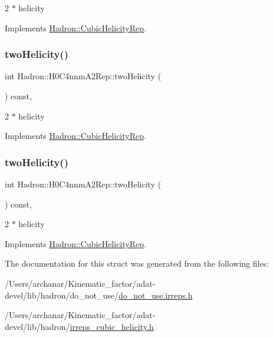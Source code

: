 2 $\ast$ helicity 

Implements \mbox{\hyperlink{structHadron_1_1CubicHelicityRep_af507aa56fc2747eacc8cb6c96db31ecc}{Hadron\+::\+Cubic\+Helicity\+Rep}}.

\mbox{\label{structHadron_1_1H0C4nnmA2Rep_a397249fde56ef379e5651fa31203da8c}} 
\subsubsection{\texorpdfstring{twoHelicity()}{twoHelicity()}\hspace{0.1cm}{\footnotesize\ttfamily [2/3]}}
{\footnotesize\ttfamily int Hadron\+::\+H0\+C4nnm\+A2\+Rep\+::two\+Helicity (\begin{DoxyParamCaption}{ }\end{DoxyParamCaption}) const\hspace{0.3cm}{\ttfamily [inline]}, {\ttfamily [virtual]}}

2 $\ast$ helicity 

Implements \mbox{\hyperlink{structHadron_1_1CubicHelicityRep_af507aa56fc2747eacc8cb6c96db31ecc}{Hadron\+::\+Cubic\+Helicity\+Rep}}.

\mbox{\label{structHadron_1_1H0C4nnmA2Rep_a397249fde56ef379e5651fa31203da8c}} 
\subsubsection{\texorpdfstring{twoHelicity()}{twoHelicity()}\hspace{0.1cm}{\footnotesize\ttfamily [3/3]}}
{\footnotesize\ttfamily int Hadron\+::\+H0\+C4nnm\+A2\+Rep\+::two\+Helicity (\begin{DoxyParamCaption}{ }\end{DoxyParamCaption}) const\hspace{0.3cm}{\ttfamily [inline]}, {\ttfamily [virtual]}}

2 $\ast$ helicity 

Implements \mbox{\hyperlink{structHadron_1_1CubicHelicityRep_af507aa56fc2747eacc8cb6c96db31ecc}{Hadron\+::\+Cubic\+Helicity\+Rep}}.



The documentation for this struct was generated from the following files\+:\begin{DoxyCompactItemize}
\item 
/\+Users/archanar/\+Kinematic\+\_\+factor/adat-\/devel/lib/hadron/do\+\_\+not\+\_\+use/\mbox{\hyperlink{adat-devel_2lib_2hadron_2do__not__use_2do__not__use_8irreps_8h}{do\+\_\+not\+\_\+use.\+irreps.\+h}}\item 
/\+Users/archanar/\+Kinematic\+\_\+factor/adat-\/devel/lib/hadron/\mbox{\hyperlink{adat-devel_2lib_2hadron_2irreps__cubic__helicity_8h}{irreps\+\_\+cubic\+\_\+helicity.\+h}}\end{DoxyCompactItemize}
